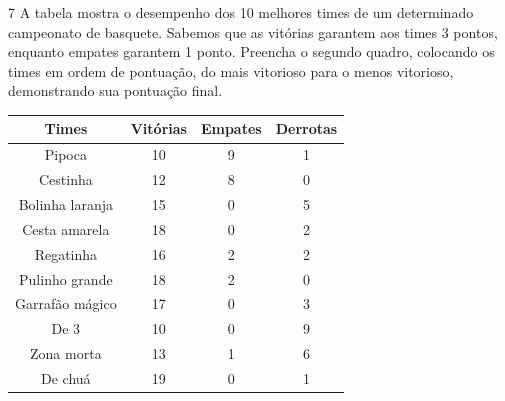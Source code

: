 \num{7} A tabela mostra o desempenho dos 10 melhores times de um
determinado campeonato de basquete. Sabemos que as vitórias garantem aos
times 3 pontos, enquanto empates garantem 1 ponto. Preencha o segundo quadro,
colocando os times em ordem de pontuação, do mais vitorioso para o menos
vitorioso, demonstrando sua pontuação final.


\begin{table}[H]
\centering
\begin{tabular}{|c|c|c|c|}
\hline
\textbf{Times}  & \textbf{Vitórias} & \textbf{Empates} & \textbf{Derrotas} \\ \hline
Pipoca          & 10                & 9                & 1                 \\ \hline
Cestinha        & 12                & 8                & 0                 \\ \hline
Bolinha laranja & 15                & 0                & 5                 \\ \hline
Cesta amarela   & 18                & 0                & 2                 \\ \hline
Regatinha       & 16                & 2                & 2                 \\ \hline
Pulinho grande  & 18                & 2                & 0                 \\ \hline
Garrafão mágico & 17                & 0                & 3                 \\ \hline
De 3            & 10                & 0                & 9                 \\ \hline
Zona morta      & 13                & 1                & 6                 \\ \hline
De chuá         & 19                & 0                & 1                 \\ \hline
\end{tabular}
\end{table}

